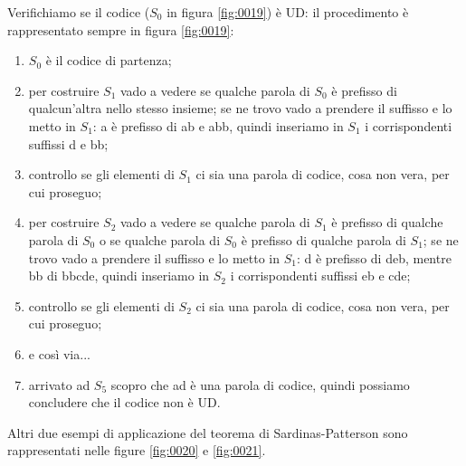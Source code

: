 \noindent
Verifichiamo se il codice ($S_0$ in figura \ref{fig:0019}) è UD: il procedimento è rappresentato sempre in figura \ref{fig:0019}:
\begin{enumerate}
\item \(S_0\) è il codice di partenza;
\item per costruire \(S_1\) vado a vedere se qualche parola di \(S_0\) è prefisso di qualcun'altra nello stesso insieme; se ne trovo vado a prendere il suffisso e lo metto in \(S_1\): a è prefisso di ab e abb, quindi inseriamo in \(S_1\) i corrispondenti suffissi d e bb;
\item controllo se gli elementi di \(S_1\) ci sia una parola di codice, cosa non vera, per cui proseguo;
\item per costruire \(S_2\) vado a vedere se qualche parola di \(S_1\) è prefisso di qualche parola di \(S_0\) o se qualche parola di \(S_0\) è prefisso di qualche parola di \(S_1\); se ne trovo vado a prendere il suffisso e lo metto in \(S_1\): d è prefisso di deb, mentre bb di bbcde, quindi inseriamo in \(S_2\) i corrispondenti suffissi eb e cde;
\item controllo se gli elementi di \(S_2\) ci sia una parola di codice, cosa non vera, per cui proseguo;
\item e così via...
\item arrivato ad  \(S_5\) scopro che ad è una parola di codice, quindi possiamo concludere che il codice non è UD.
\end{enumerate}
Altri due esempi di applicazione del teorema di Sardinas-Patterson sono rappresentati nelle figure \ref{fig:0020} e \ref{fig:0021}.


